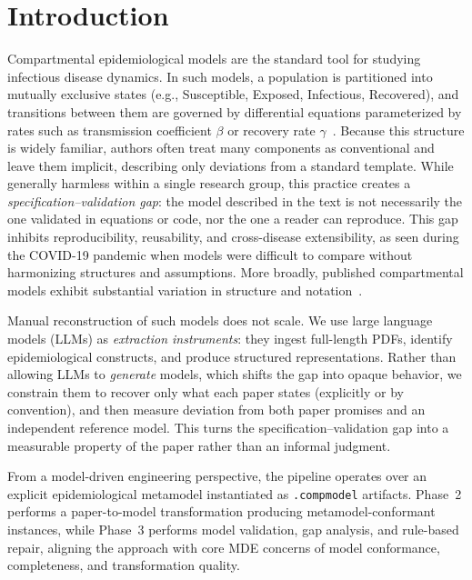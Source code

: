 \section{Introduction}

Compartmental epidemiological models are the standard tool for studying infectious disease
dynamics. In such models, a population is partitioned into mutually exclusive states
(e.g., Susceptible, Exposed, Infectious, Recovered), and transitions between them are
governed by differential equations parameterized by rates such as transmission
coefficient $\beta$ or recovery rate $\gamma$~\cite{keeling2008modeling}.
Because this structure is widely familiar, authors often treat many components as
conventional and leave them implicit, describing only deviations from a standard template.
While generally harmless within a single research group, this practice creates a
\textit{specification--validation gap}: the model described in the text is not necessarily
the one validated in equations or code, nor the one a reader can reproduce. This gap
inhibits reproducibility, reusability, and cross-disease extensibility, as seen during
the COVID-19 pandemic when models were difficult to compare without harmonizing
structures and assumptions. More broadly, published compartmental models exhibit
substantial variation in structure and notation~\cite{keeling2008modeling}.

Manual reconstruction of such models does not scale. We use large language models (LLMs)
as \emph{extraction instruments}: they ingest full-length PDFs, identify epidemiological
constructs, and produce structured representations. Rather than allowing LLMs to
\emph{generate} models, which shifts the gap into opaque behavior, we constrain them to
recover only what each paper states (explicitly or by convention), and then measure
deviation from both paper promises and an independent reference model. This turns the
specification--validation gap into a measurable property of the paper rather than an
informal judgment.

From a model-driven engineering perspective, the pipeline operates over an explicit
epidemiological metamodel instantiated as \texttt{.compmodel} artifacts. Phase~2 performs
a paper-to-model transformation producing metamodel-conformant instances, while Phase~3
performs model validation, gap analysis, and rule-based repair, aligning the approach
with core MDE concerns of model conformance, completeness, and transformation quality.

